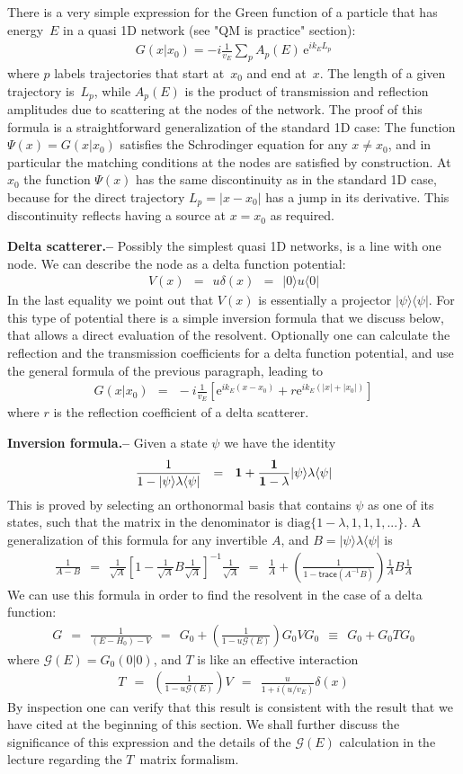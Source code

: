 \documentclass[onecolumn,fleqn, 11pt]{revtex4}
\newcommand{\trc}{\mathsf{trace}}
\newcommand{\eexp}{\mathrm{e}^}
\newcommand{\beq}{\begin{eqnarray}}
\newcommand{\eeq}{\end{eqnarray}}
\begin{document}
There is a very simple expression for the Green function of a particle 
that has energy~$E$ in a quasi 1D network (see "QM is practice" section):
\beq
G(x|x_0) = -i\frac{1}{v_E} \sum_p A_p(E) \, \eexp{ik_E L_p}
\eeq
where $p$ labels trajectories that start at~$x_0$ and end at~$x$.  
The length of a given trajectory is~$L_p$, while $A_p(E)$ 
is the product of transmission and reflection amplitudes 
due to scattering at the nodes of the network.
The proof of this formula is a straightforward generalization 
of the standard 1D case: The function $\Psi(x)=G(x|x_0)$ satisfies the Schrodinger 
equation for any $x\ne x_0$, and in particular the matching 
conditions at the nodes are satisfied by construction.
At $x_0$ the function $\Psi(x)$ has the same discontinuity 
as in the standard 1D case, because for the direct trajectory $L_p=|x-x_0|$ 
has a jump in its derivative. 
This discontinuity reflects having a source at $x=x_0$ as required.   



{\bf Delta scatterer.-- } 
Possibly the simplest quasi 1D networks, is a line with one node. 
We can describe the node as a delta function potential:
\beq
V(x) \ \ = \ \ u\delta(x) \ \ = \ \   |0 \rangle u \langle 0|
\eeq
In the last equality we point out that $V(x)$ is essentially 
a projector $|\psi\rangle\langle \psi|$. For this type of potential   
there is a simple inversion formula that we discuss below,  
that allows a direct evaluation of the resolvent.     
Optionally one can calculate the reflection and the transmission 
coefficients for a delta function potential, and use the 
general formula of the previous paragraph, leading to 
\beq
G(x|x_0) \ \ = \ \ -i\frac{1}{v_E} \left[ \eexp{ik_E (x-x_0)} + r \eexp{ik_E(|x|+|x_0|)}\right] 
\eeq
where $r$ is the reflection coefficient of a delta scatterer. 


{\bf Inversion formula.-- }
Given a state $\psi$  we have the identity 
\beq
\frac{1}{1-|\psi\rangle\lambda\langle \psi|} 
\ \ = \ \ 
\bf{1}+\frac{1}{1-\lambda}|\psi\rangle\lambda\langle \psi|
\eeq
This is proved by selecting an orthonormal basis that contains $\psi$ 
as one of its states, such that the matrix in the denominator 
is ${\mbox{diag}\{1{-}\lambda,1,1,1,...\}}$.  
A generalization of this formula for any invertible $A$, 
and $B=|\psi\rangle\lambda\langle\psi|$ is
\beq
\frac{1}{A-B} 
\ \ = \ \ 
\frac{1}{\sqrt{A}} \left[1- \frac{1}{\sqrt{A}}B\frac{1}{\sqrt{A}}\right]^{-1} \frac{1}{\sqrt{A}}
\ \ = \ \ 
\frac{1}{A}+  \left(\frac{1}{1-\trc(A^{-1}B)}\right) \frac{1}{A}B\frac{1}{A}
\eeq
We can use this formula in order to find the resolvent 
in the case of a delta function:
\beq
G \ \ = \ \ 
\frac{1}{(E-H_0)-V} 
\ \ = \ \ 
G_0 +  \left(\frac{1}{1-u\mathcal{G}(E)}\right) G_0 V G_0 
\ \ \equiv \ \ 
G_0 +  G_0 T G_0  
\eeq
where $\mathcal{G}(E)=G_0(0|0)$, and $T$ is like an effective interaction   
\beq
T \ \ = \ \ \left(\frac{1}{1-u\mathcal{G}(E)}\right) V \ \ = \ \  \frac{u}{1+i(u/v_E)}\delta(x) 
\eeq
By inspection one can verify that this result is 
consistent with the result that we have cited at the 
beginning of this section.   
We shall further discuss the significance of this expression 
and the details of the $\mathcal{G}(E)$ calculation in 
the lecture regarding the $T$~matrix formalism.
\end{document}
